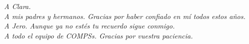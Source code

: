 \begin{center}
\textit{A Clara.}\\
\textit{A mis padres y hermanos. Gracias por haber confiado en mí todos estos años.}\\
\textit{A Jero. Aunque ya no estés tu recuerdo sigue conmigo.}\\
\textit{A todo el equipo de COMPSs. Gracias por vuestra paciencia.}
\end{center}
